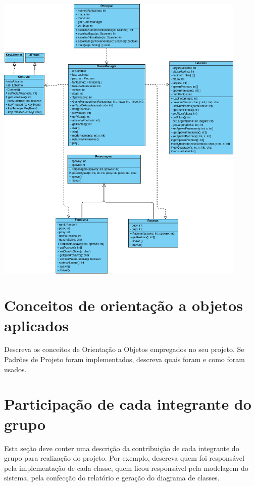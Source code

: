 \documentclass[]{article}
\begin{document}
\begin{center}
\includegraphics[width=12cm]{UML.PNG}
\end{center}

\section{Conceitos de orientação a objetos aplicados}
Descreva os conceitos de Orientação a Objetos empregados no seu projeto. Se Padrões de Projeto foram implementados, descreva quais foram e como foram usados.

\section{Participação de cada integrante do grupo}
Esta seção deve conter uma descrição da contribuição de cada integrante do grupo para realização do projeto. Por exemplo, descreva quem foi responsável pela implementação de cada classe, quem ficou responsável pela modelagem do sistema, pela confecção do relatório e geração do diagrama de classes.
\end{document}
